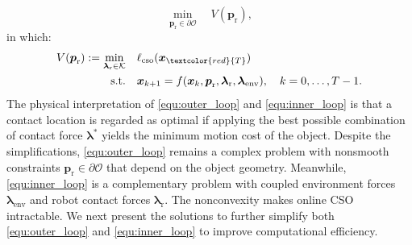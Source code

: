 \begin{equation}
 \min_{\boldsymbol{p}_{\text{r}} \in \partial \mathcal{O}}
 \quad V(\boldsymbol{p}_{\text{r}})\label{equ:outer_loop},
\end{equation}
in which:
\begin{equation}
\begin{aligned}
V(\boldsymbol{p}_{\text{r}})
:= \min_{\boldsymbol{\lambda}_{\text{r}} \in \mathcal{K}} \quad &
\ell_{\text{cso}}(\boldsymbol{x}_{\textcolor{red}{T}}) \\
\text{s.t.} \quad
& \boldsymbol{x}_{k+1}
= f(\boldsymbol{x}_k, \boldsymbol{p}_{\text{r}}, \boldsymbol{\lambda}_{\text{r}}, \boldsymbol{\lambda}_{\text{env}}),
\quad k = 0, \dots, T-1.
\end{aligned}\label{equ:inner_loop}
\end{equation}
The physical interpretation of \eqref{equ:outer_loop} and \eqref{equ:inner_loop} is that a contact location is regarded as optimal if applying the best possible combination of contact force $\boldsymbol{\lambda}^*$ yields the minimum motion cost of the object. Despite the simplifications, \eqref{equ:outer_loop} remains a complex problem with nonsmooth constraints $\boldsymbol{p}_{\text{r}} \in \partial \mathcal{O}$ that depend on the object geometry. Meanwhile, \eqref{equ:inner_loop} is a complementary problem with coupled environment forces $\boldsymbol{\lambda}_{\text{env}}$ and robot contact forces $\boldsymbol{\lambda}_{\text{r}}$. The nonconvexity makes online CSO intractable. We next present the solutions to further simplify both \eqref{equ:outer_loop} and \eqref{equ:inner_loop} to improve computational efficiency.

